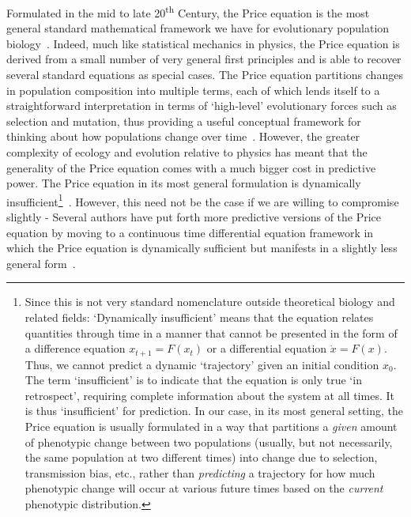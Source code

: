 Formulated in the mid to late 20\textsuperscript{th} Century, the Price equation is the most general standard mathematical framework we have for evolutionary population biology~\citep{frank_natural_2012,frank_universal_2017,queller_fundamental_2017,luque_one_2017,lion_theoretical_2018,lehtonen_price_2018,lehtonen_price_2020,luque_mirror_2021}. Indeed, much like statistical mechanics in physics, the Price equation is derived from a small number of very general first principles and is able to recover several standard equations as special cases. The Price equation partitions changes in population composition into multiple terms, each of which lends itself to a straightforward interpretation in terms of `high-level' evolutionary forces such as selection and mutation, thus providing a useful conceptual framework for thinking about how populations change over time~\citep{frank_natural_2012}. However, the greater complexity of ecology and evolution relative to physics has meant that the generality of the Price equation comes with a much bigger cost in predictive power. The Price equation in its most general formulation is dynamically insufficient\footnote{Since this is not very standard nomenclature outside theoretical biology and related fields: `Dynamically insufficient' means that the equation relates quantities through time in a manner that cannot be presented in the form of a difference equation $x_{t+1} = F(x_t)$ or a differential equation $\dot{x} = F(x)$. Thus, we cannot predict a dynamic `trajectory' given an initial condition $x_0$. The term `insufficient' is to indicate that the equation is only true `in retrospect', requiring complete information about the system at all times. It is thus `insufficient' for prediction. In our case, in its most general setting, the Price equation is usually formulated in a way that partitions a \emph{given} amount of phenotypic change between two populations (usually, but not necessarily, the same population at two different times) into change due to selection, transmission bias, etc., rather than \emph{predicting} a trajectory for how much phenotypic change will occur at various future times based on the \emph{current} phenotypic distribution.}~\citep{van_veelen_use_2005,frank_natural_2012,simon_continuous-time_2014,queller_fundamental_2017}. However, this need not be the case if we are willing to compromise slightly - Several authors have put forth more predictive versions of the Price equation by moving to a continuous time differential equation framework in which the Price equation is dynamically sufficient but manifests in a slightly less general form~\citep{page_unifying_2002,lion_theoretical_2018,day_price_2020}.

